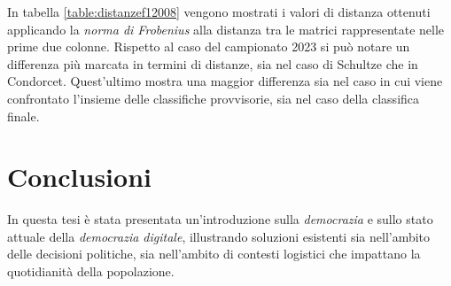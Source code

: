 \documentclass[12pt,a4paper,openright,twoside]{book}
\begin{document}
 In tabella \ref{table:distanzef12008} vengono mostrati i valori di distanza ottenuti applicando la 
 \textit{norma di Frobenius} alla distanza tra le matrici rappresentate nelle prime due colonne.
 Rispetto al caso del campionato 2023 si può notare un differenza più marcata in termini di distanze, sia nel caso
 di Schultze che in Condorcet. Quest'ultimo mostra una maggior differenza sia nel caso in cui viene confrontato
 l'insieme delle classifiche provvisorie, sia nel caso della classifica finale.
 \begin{table}[H]
    \centering
    \begingroup
    \endgroup

    \caption{Campionato \textit{F1} 2008 - Valori di distanza ottenuti applicando la 
    \textit{norma di Frobenius} alla differenza delle matrici rappresentate nelle prime due colonne.
    }
    \label{table:distanzef12008}
\end{table}
\chapter{Conclusioni}

In questa tesi è stata presentata un'introduzione sulla \textit{democrazia} e sullo stato attuale 
della \textit{democrazia digitale}, illustrando soluzioni esistenti sia nell'ambito delle decisioni
politiche, sia nell'ambito di contesti logistici che impattano la quotidianità della popolazione.
\end{document}
